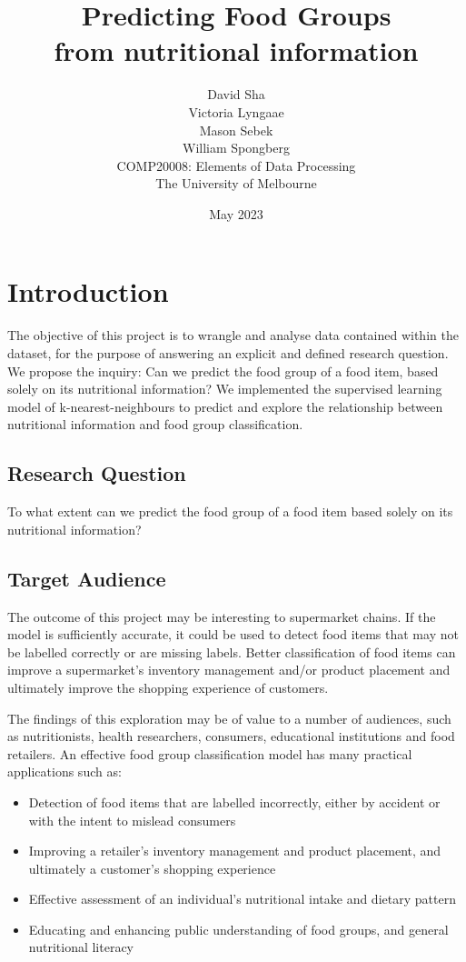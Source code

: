 \documentclass[11pt]{article}
\title{Predicting Food Groups \\ \vspace{0.5em} \large from nutritional information}
\author{
    David Sha\\
\AND
    Victoria Lyngaae\\
\AND
    Mason Sebek\\
\AND
    William Spongberg\\
\AND
\AND
	COMP20008: Elements of Data Processing\\
\AND
	The University of Melbourne\\
}
\date{May 2023}
\begin{document}
\maketitle

\newpage
\tableofcontents
\thispagestyle{empty}

\newpage
\setcounter{page}{1}
\section{Introduction}

The objective of this project is to wrangle and analyse data contained within the \cite{FoodStandardsAustraliaNewZealand} dataset, for the purpose of answering an explicit and defined research question. We propose the inquiry: Can we predict the food group of a food item, based solely on its nutritional information? We implemented the supervised learning model of k-nearest-neighbours to predict and explore the relationship between nutritional information and food group classification.

\subsection{Research Question}
To what extent can we predict the food group of a food item based solely on its nutritional information?

\subsection{Target Audience}
The outcome of this project may be interesting to supermarket chains. If the model is sufficiently accurate, it could be used to detect food items that may not be labelled correctly or are missing labels. Better classification of food items can improve a supermarket's inventory management and/or product placement and ultimately improve the shopping experience of customers.

The findings of this exploration may be of value to a number of audiences, such as nutritionists, health researchers, consumers, educational institutions and food retailers.  An effective food group classification model has many practical applications such as:
\begin{itemize}
    \item Detection of food items that are labelled incorrectly, either by accident or with the intent to mislead consumers
    \item Improving a retailer's inventory management and product placement, and ultimately a customer's shopping experience
    \item Effective assessment of an individual's nutritional intake and dietary pattern
    \item Educating and enhancing public understanding of food groups, and general nutritional literacy
\end{itemize}
\end{document}
